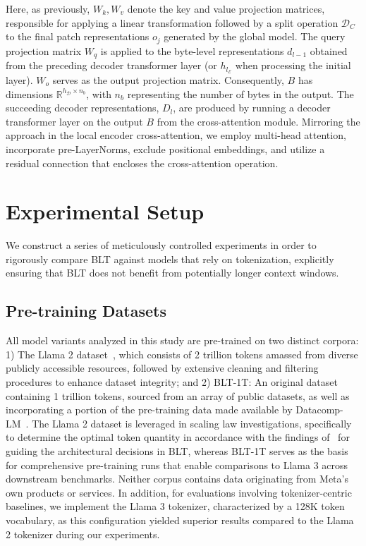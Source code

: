 Here, as previously, $W_k, W_v$ denote the key and value projection matrices, responsible for applying a linear transformation followed by a split operation $\mathcal{D}_C$ to the final patch representations $o_j$ generated by the global model. The query projection matrix $W_q$ is applied to the byte-level representations $d_{l-1}$ obtained from the preceding decoder transformer layer (or $h_{l_{\mathcal{E}}}$ when processing the initial layer). $W_o$ serves as the output projection matrix. Consequently, $B$ has dimensions $\mathbb{R}^{h_{\mathcal{D}} \times n_b}$, with $n_b$ representing the number of bytes in the output. The succeeding decoder representations, $D_l$, are produced by running a decoder transformer layer on the output $B$ from the cross-attention module. Mirroring the approach in the local encoder cross-attention, we employ multi-head attention, incorporate pre-LayerNorms, exclude positional embeddings, and utilize a residual connection that encloses the cross-attention operation.

\section{Experimental Setup}
\label{section:experiments}
We construct a series of meticulously controlled experiments in order to rigorously compare {\textsc BLT} against models that rely on tokenization, explicitly ensuring that {\textsc BLT} does not benefit from potentially longer context windows.

\subsection{Pre-training Datasets}  
All model variants analyzed in this study are pre-trained on two distinct corpora: 1) The Llama 2 dataset~\citep{touvron2023llama}, which consists of 2 trillion tokens amassed from diverse publicly accessible resources, followed by extensive cleaning and filtering procedures to enhance dataset integrity; and 2) {\textsc BLT}-1T: An original dataset containing 1 trillion tokens, sourced from an array of public datasets, as well as incorporating a portion of the pre-training data made available by Datacomp-LM~\citep{li2024datacomp}. The Llama 2 dataset is leveraged in scaling law investigations, specifically to determine the optimal token quantity in accordance with the findings of~\cite{dubey2024llama} for guiding the architectural decisions in {\textsc BLT}, whereas {\textsc BLT}-1T serves as the basis for comprehensive pre-training runs that enable comparisons to Llama 3 across downstream benchmarks. Neither corpus contains data originating from Meta's own products or services. In addition, for evaluations involving tokenizer-centric baselines, we implement the Llama 3 tokenizer, characterized by a 128K token vocabulary, as this configuration yielded superior results compared to the Llama 2 tokenizer during our experiments.

